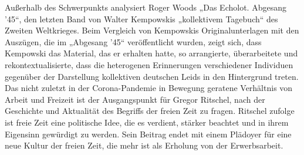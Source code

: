 \begin{multicols*}{2}
Außerhalb des Schwerpunkts analysiert Roger Woods „Das Echolot. Abgesang ’45“, den letzten Band von Walter Kempowskis „kollektivem Tagebuch“ des Zweiten Weltkrieges. Beim Vergleich von Kempowskis Originalunterlagen mit den Auszügen, die im „Abgesang ’45“ veröffentlicht wurden, zeigt sich, dass Kempowski das Material, das er erhalten hatte, so arrangierte, überarbeitete und rekontextualisierte, dass die heterogenen Erinnerungen verschiedener Individuen gegenüber der Darstellung kollektiven deutschen Leids in den Hintergrund treten. Das nicht zuletzt in der Corona-Pandemie in Bewegung geratene Verhältnis von Arbeit und Freizeit ist der Ausgangspunkt für Gregor Ritschel, nach der Geschichte und Aktualität des Begriffs der freien Zeit zu fragen. Ritschel zufolge ist freie Zeit eine politische Idee, die es verdient, stärker beachtet und in ihrem Eigensinn gewürdigt zu werden. Sein Beitrag endet mit einem Plädoyer für eine neue Kultur der freien Zeit, die mehr ist als Erholung von der Erwerbsarbeit.

\end{multicols*}

\pagebreak
